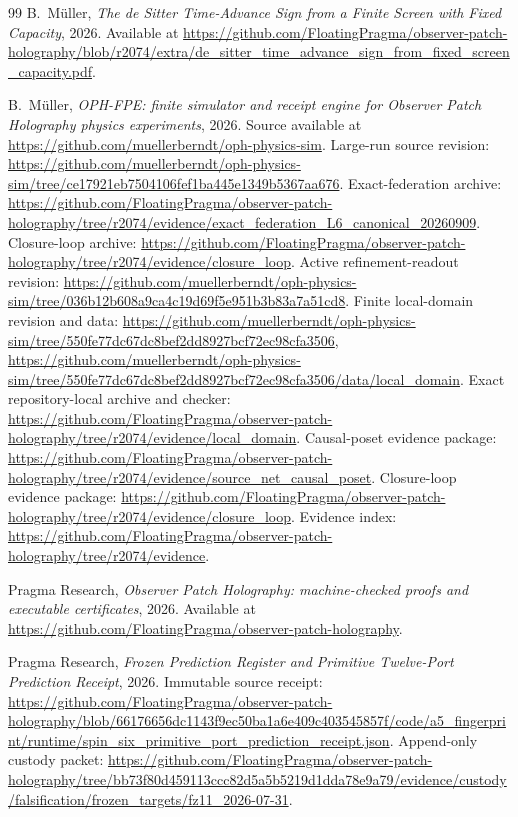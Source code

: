 \begin{thebibliography}{99}
B.~M\"uller,
\emph{The de Sitter Time-Advance Sign from a Finite Screen with Fixed Capacity},
2026.
Available at
\url{https://github.com/FloatingPragma/observer-patch-holography/blob/r2074/extra/de_sitter_time_advance_sign_from_fixed_screen_capacity.pdf}.

B.~M\"uller,
\emph{OPH-FPE: finite simulator and receipt engine for Observer Patch Holography physics experiments},
2026.
Source available at \url{https://github.com/muellerberndt/oph-physics-sim}.
Large-run source revision:
\url{https://github.com/muellerberndt/oph-physics-sim/tree/ce17921eb7504106fef1ba445e1349b5367aa676}.
Exact-federation archive:
\url{https://github.com/FloatingPragma/observer-patch-holography/tree/r2074/evidence/exact_federation_L6_canonical_20260909}.
Closure-loop archive:
\url{https://github.com/FloatingPragma/observer-patch-holography/tree/r2074/evidence/closure_loop}.
Active refinement-readout revision:
\url{https://github.com/muellerberndt/oph-physics-sim/tree/036b12b608a9ca4c19d69f5e951b3b83a7a51cd8}.
Finite local-domain revision and data:
\url{https://github.com/muellerberndt/oph-physics-sim/tree/550fe77dc67dc8bef2dd8927bcf72ec98cfa3506},
\url{https://github.com/muellerberndt/oph-physics-sim/tree/550fe77dc67dc8bef2dd8927bcf72ec98cfa3506/data/local_domain}.
Exact repository-local archive and checker:
\url{https://github.com/FloatingPragma/observer-patch-holography/tree/r2074/evidence/local_domain}.
Causal-poset evidence package:
\url{https://github.com/FloatingPragma/observer-patch-holography/tree/r2074/evidence/source_net_causal_poset}.
Closure-loop evidence package:
\url{https://github.com/FloatingPragma/observer-patch-holography/tree/r2074/evidence/closure_loop}.
Evidence index:
\url{https://github.com/FloatingPragma/observer-patch-holography/tree/r2074/evidence}.

Pragma Research,
\emph{Observer Patch Holography: machine-checked proofs and executable certificates},
2026.
Available at \url{https://github.com/FloatingPragma/observer-patch-holography}.

Pragma Research,
\emph{Frozen Prediction Register and Primitive Twelve-Port Prediction Receipt},
2026.
Immutable source receipt:
\url{https://github.com/FloatingPragma/observer-patch-holography/blob/66176656dc1143f9ec50ba1a6e409c403545857f/code/a5_fingerprint/runtime/spin_six_primitive_port_prediction_receipt.json}.
Append-only custody packet:
\url{https://github.com/FloatingPragma/observer-patch-holography/tree/bb73f80d459113ccc82d5a5b5219d1dda78e9a79/evidence/custody/falsification/frozen_targets/fz11_2026-07-31}.


\end{thebibliography}
